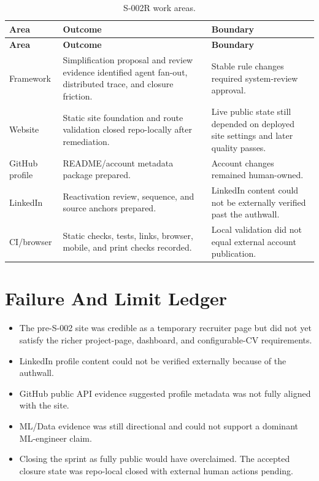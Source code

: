 \documentclass[a4paper,11pt,openany]{report}
\begin{document}
\begin{longtable}{p{} p{} p{}}
\caption{S-002R work areas.}\\
\toprule
\textbf{Area} & \textbf{Outcome} & \textbf{Boundary} \\
\midrule
\endfirsthead
\toprule
\textbf{Area} & \textbf{Outcome} & \textbf{Boundary} \\
\midrule
\endhead
Framework & Simplification proposal and review evidence identified agent fan-out, distributed trace, and closure friction. & Stable rule changes required system-review approval. \\
Website & Static site foundation and route validation closed repo-locally after remediation. & Live public state still depended on deployed site settings and later quality passes. \\
GitHub profile & README/account metadata package prepared. & Account changes remained human-owned. \\
LinkedIn & Reactivation review, sequence, and source anchors prepared. & LinkedIn content could not be externally verified past the authwall. \\
CI/browser & Static checks, tests, links, browser, mobile, and print checks recorded. & Local validation did not equal external account publication. \\
\bottomrule
\end{longtable}

\chapter{Failure And Limit Ledger}

\begin{itemize}
  \item The pre-S-002 site was credible as a temporary recruiter page but did
    not yet satisfy the richer project-page, dashboard, and configurable-CV
    requirements.
  \item LinkedIn profile content could not be verified externally because of
    the authwall.
  \item GitHub public API evidence suggested profile metadata was not fully
    aligned with the site.
  \item ML/Data evidence was still directional and could not support a dominant
    ML-engineer claim.
  \item Closing the sprint as fully public would have overclaimed. The accepted
    closure state was repo-local closed with external human actions pending.
\end{itemize}
\end{document}
